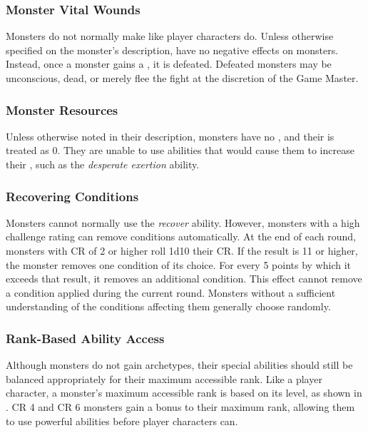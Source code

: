         \subsubsection{Monster Vital Wounds}
            Monsters do not normally make  like player characters do.
            Unless otherwise specified on the monster's description,  have no negative effects on monsters.
            Instead, once a monster gains a , it is defeated.
            Defeated monsters may be unconscious, dead, or merely flee the fight at the discretion of the Game Master.

        \subsubsection{Monster Resources}
            Unless otherwise noted in their description, monsters have no , and their  is treated as 0.
            They are unable to use abilities that would cause them to increase their , such as the \textit{desperate exertion} ability.

        \subsubsection{Recovering Conditions}
            Monsters cannot normally use the \textit{recover} ability.
            However, monsters with a high challenge rating can remove conditions automatically.
            At the end of each round, monsters with CR of 2 or higher roll 1d10 \add their CR.
            If the result is 11 or higher, the monster removes one condition of its choice.
            For every 5 points by which it exceeds that result, it removes an additional condition.
            This effect cannot remove a condition applied during the current round.
            Monsters without a sufficient understanding of the conditions affecting them generally choose randomly.

        \subsubsection{Rank-Based Ability Access}
            Although monsters do not gain archetypes, their special abilities should still be balanced appropriately for their maximum accessible rank.
            Like a player character, a monster's maximum accessible rank is based on its level, as shown in .
            CR 4 and CR 6 monsters gain a  bonus to their maximum rank, allowing them to use powerful abilities before player characters can.

